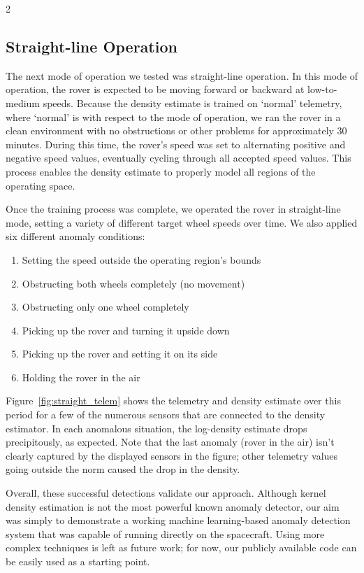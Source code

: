 \documentclass[10pt, fleqn]{article}
\begin{document}
\begin{multicols*}{2}
\subsection{Straight-line Operation}

The next mode of operation we tested was straight-line operation.
In this mode of operation,
the rover is expected to be moving forward or backward at low-to-medium speeds.
Because the density estimate is trained on `normal' telemetry,
where `normal' is with respect to the mode of operation,
we ran the rover in a clean environment with no obstructions or other problems
for approximately 30 minutes.
During this time,
the rover's speed was set to alternating positive and negative speed values,
eventually cycling through all accepted speed values.
This process enables the density estimate to properly model
all regions of the operating space.

Once the training process was complete,
we operated the rover in straight-line mode,
setting a variety of different target wheel speeds
over time.
We also applied six different anomaly conditions:

\begin{enumerate}
  \itemsep -2pt
  \item Setting the speed outside the operating region's bounds
  \item Obstructing both wheels completely (no movement)
  \item Obstructing only one wheel completely
  \item Picking up the rover and turning it upside down
  \item Picking up the rover and setting it on its side
  \item Holding the rover in the air
\end{enumerate}

Figure~\ref{fig:straight_telem} shows the telemetry and density estimate
over this period
for a few of the numerous sensors that are connected to the density estimator.
In each anomalous situation,
the log-density estimate drops precipitously,
as expected.
Note that the last anomaly (rover in the air)
isn't clearly captured by the displayed sensors in the figure;
other telemetry values going outside the norm caused the drop in the density.

Overall, these successful detections validate our approach.
Although kernel density estimation is not the most powerful known anomaly detector,
our aim was simply to demonstrate a working machine learning-based anomaly detection system
that was capable of running directly on the spacecraft.
Using more complex techniques is left as future work;
for now, our publicly available code can be easily used as a starting point.


\end{multicols*}
\end{document}
